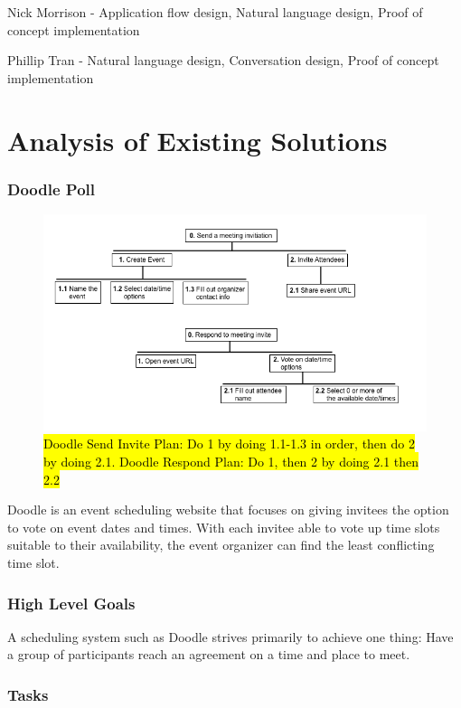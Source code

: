 \documentclass{sigchi}
\begin{document}
Nick Morrison - Application flow design, Natural language design, Proof of concept implementation

Phillip Tran - Natural language design, Conversation design, Proof of concept implementation


\section{Analysis of Existing Solutions}

\subsubsection{Doodle Poll}
\FloatBarrier
\begin{figure}
  \centering
  \includegraphics[width=1.75\columnwidth]{doodle/hta}
  \caption{\hl{Doodle Send Invite Plan: Do 1 by doing 1.1-1.3 in order, then do 2 by doing 2.1. Doodle Respond Plan: Do 1, then 2 by doing 2.1 then 2.2}}
\end{figure}

Doodle is an event scheduling website that focuses on giving invitees the option to vote on event dates and times. With each invitee able to vote up time slots suitable to their availability, the event organizer can find the least conflicting time slot.

\subsubsection{High Level Goals}

A scheduling system such as Doodle strives primarily to achieve one
thing: Have a group of participants reach an agreement on a time and
place to meet.

\subsubsection{Tasks}
\end{document}
